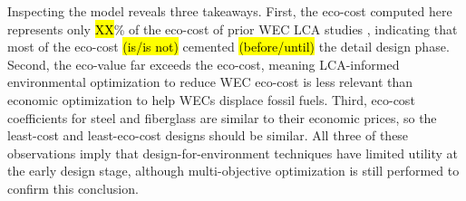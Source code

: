\documentclass[10pt,twoside]{article}
\begin{document}
Inspecting the model reveals three takeaways.
First, the eco-cost computed here represents only \hl{XX}\% of the eco-cost of prior WEC LCA studies \cite{pennock_life_2022}, indicating that most of the eco-cost \hl{(is/is not)} cemented \hl{(before/until)} the detail design phase.
Second, the eco-value far exceeds the eco-cost, meaning LCA-informed environmental optimization to reduce WEC eco-cost is less relevant than economic optimization to help WECs displace fossil fuels.
Third, eco-cost coefficients for steel and fiberglass are similar to their economic prices, so the least-cost and least-eco-cost designs should be similar.
All three of these observations imply that design-for-environment techniques have limited utility at the early design stage, although multi-objective optimization is still performed to confirm this conclusion.
\end{document}
